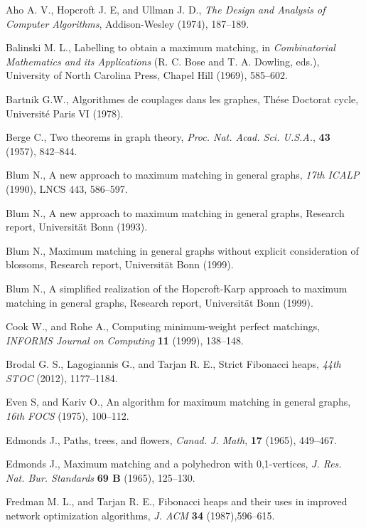 \documentclass[12pt,twoside,a4paper]{article}
\begin{document}
\begin{thebibliography}{99}
\frenchspacing

 Aho A. V., Hopcroft J. E, and Ullman J. D.,
{\em The Design and Analysis of Computer Algorithms\/},
Addison-Wesley (1974), 187--189.

 Balinski M. L.,
Labelling to obtain a maximum matching, in {\em Combinatorial Mathematics
and its Applications\/} (R. C. Bose and T. A. Dowling, eds.),
University of North Carolina Press, Chapel Hill (1969), 585--602.



 Bartnik G.W.,
Algorithmes de couplages dans les graphes,
Th\'ese Doctorat  cycle, Universit\'e Paris VI (1978).

 Berge C.,
Two theorems in graph theory, {\em Proc. Nat. Acad. Sci. U.S.A.\/},
{\bf 43} (1957), 842--844.

 Blum N., A new approach to maximum matching in general graphs,
{\em 17th ICALP\/} (1990), LNCS 443, 586--597.

 Blum N., A new approach to maximum matching in general graphs,
Research report, Universit\"at Bonn (1993).

 Blum N., Maximum matching in general graphs without explicit
consideration of blossoms, Research report, Universit\"at Bonn (1999).

 Blum N., A simplified realization of the Hopcroft-Karp approach
to maximum matching in general graphs, Research report, Universit\"at
Bonn (1999).

 Cook W., and Rohe A., Computing minimum-weight perfect matchings,
{\em INFORMS Journal on Computing\/} {\bf 11} (1999), 138--148.

 Brodal G. S., Lagogiannis G., and Tarjan R. E.,
Strict Fibonacci heaps, {\em 44th STOC\/} (2012), 1177--1184.



 Even S, and Kariv O.,
An  algorithm for maximum matching in general graphs,
{\em 16th FOCS\/} (1975), 100--112.

 Edmonds J.,
Paths, trees, and flowers, {\em Canad. J. Math\/}, {\bf 17} (1965), 449--467.

 Edmonds J.,
Maximum matching and a polyhedron with 0,1-vertices, {\em J. Res. Nat. Bur.
Standards\/} {\bf 69 B} (1965), 125--130.

 Fredman M. L., and Tarjan R. E.,
Fibonacci heaps and their uses in improved network optimization algorithms,
{\em J. ACM\/} {\bf 34} (1987),596--615.


\end{thebibliography}
\end{document}
